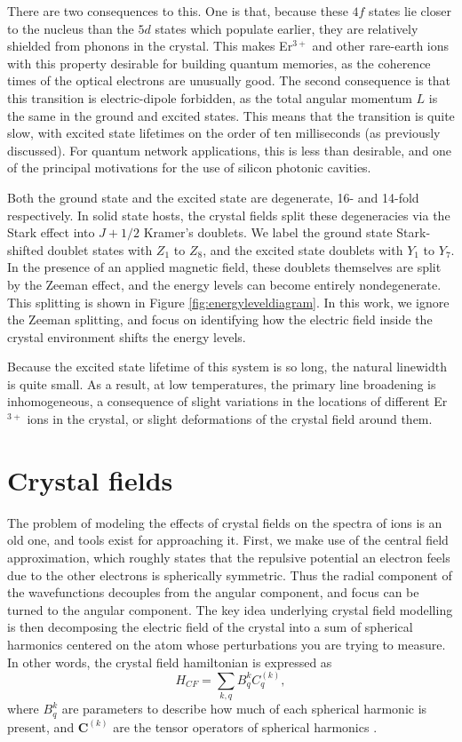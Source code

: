 \documentclass[12pt]{puthesis}
\newcommand{\erbium}[1][ ]{Er$^{3+}$#1}
\begin{document}
There are two consequences to this. One is that, because these $4f$ states lie closer to the nucleus than the $5d$ states which populate earlier, they are relatively shielded from phonons in the crystal. This makes \erbium and other rare-earth ions with this property desirable for building quantum memories, as the coherence times of the optical electrons are unusually good. The second consequence is that this transition is electric-dipole forbidden, as the total angular momentum $L$ is the same in the ground and excited states. This means that the transition is quite slow, with excited state lifetimes on the order of ten milliseconds (as previously discussed). For quantum network applications, this is less than desirable, and one of the principal motivations for the use of silicon photonic cavities. 

Both the ground state and the excited state are degenerate, 16- and 14-fold respectively. In solid state hosts, the crystal fields split these degeneracies via the Stark effect into $J+1/2$ Kramer's doublets. We label the ground state Stark-shifted doublet states with $Z_{1}$ to $Z_{8}$, and the excited state doublets with $Y_{1}$ to $Y_{7}$. In the presence of an applied magnetic field, these doublets themselves are split by the Zeeman effect, and the energy levels can become entirely nondegenerate. This splitting is shown in Figure \ref{fig:energyleveldiagram}. In this work, we ignore the Zeeman splitting, and focus on identifying how the electric field inside the crystal environment shifts the energy levels. 

Because the excited state lifetime of this system is so long, the natural linewidth is quite small. As a result, at low temperatures, the primary line broadening is inhomogeneous, a consequence of slight variations in the locations of different \erbium ions in the crystal, or slight deformations of the crystal field around them.


\section{Crystal fields}

The problem of modeling the effects of crystal fields on the spectra of ions is an old one, and tools exist for approaching it. First, we make use of the central field approximation, which roughly states that the repulsive potential an electron feels due to the other electrons is spherically symmetric. Thus the radial component of the wavefunctions decouples from the angular component, and focus can be turned to the angular component. The key idea underlying crystal field modelling is then decomposing the electric field of the crystal into a sum of spherical harmonics centered on the atom whose perturbations you are trying to measure. In other words, the crystal field hamiltonian is expressed as 
\begin{equation}\label{eq:3}
  H_{CF} = \sum_{k, q}B_{q}^{k}C_{q}^{(k)},
\end{equation}
where $B_{q}^{k}$ are parameters to describe how much of each spherical harmonic is present, and $\mathbf{C}^{(k)}$ are the tensor operators of spherical harmonics \cite{Liu2006}.
\end{document}
